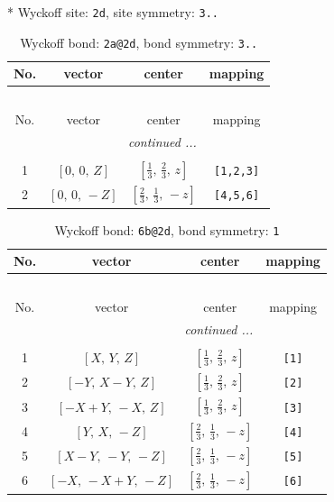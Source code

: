 \documentclass[fleqn,8pt]{jsarticle}
\begin{document}
* Wyckoff site: {\tt 2d}, site symmetry: {\tt 3..}
\renewcommand{\arraystretch}{1.2}
\begin{longtable}{cccc}
\caption{Wyckoff bond: {\tt 2a@2d}, bond symmetry: {\tt 3..}}
 \\
 \hline \hline
No. & vector & center & mapping \\ \hline \endfirsthead

\multicolumn{3}{l}{\tablename\ \thetable{}} \\
 \hline \hline
No. & vector & center & mapping \\ \hline \endhead

 \hline \hline
\multicolumn{3}{r}{\footnotesize\it continued ...} \\ \endfoot

 \hline \hline
\multicolumn{3}{r}{} \\ \endlastfoot

1 & $\left[ 0,\, 0,\, Z \right]$ & $\left[ \frac{1}{3},\, \frac{2}{3},\, z \right]$ & {\tt [1,2,3]} \\ \hline
2 & $\left[ 0,\, 0,\, - Z \right]$ & $\left[ \frac{2}{3},\, \frac{1}{3},\, - z \right]$ & {\tt [4,5,6]} \\
\end{longtable}
\renewcommand{\arraystretch}{1.2}
\begin{longtable}{cccc}
\caption{Wyckoff bond: {\tt 6b@2d}, bond symmetry: {\tt 1}}
 \\
 \hline \hline
No. & vector & center & mapping \\ \hline \endfirsthead

\multicolumn{3}{l}{\tablename\ \thetable{}} \\
 \hline \hline
No. & vector & center & mapping \\ \hline \endhead

 \hline \hline
\multicolumn{3}{r}{\footnotesize\it continued ...} \\ \endfoot

 \hline \hline
\multicolumn{3}{r}{} \\ \endlastfoot

1 & $\left[ X,\, Y,\, Z \right]$ & $\left[ \frac{1}{3},\, \frac{2}{3},\, z \right]$ & {\tt [1]} \\ \hline
2 & $\left[ - Y,\, X - Y,\, Z \right]$ & $\left[ \frac{1}{3},\, \frac{2}{3},\, z \right]$ & {\tt [2]} \\ \hline
3 & $\left[ - X + Y,\, - X,\, Z \right]$ & $\left[ \frac{1}{3},\, \frac{2}{3},\, z \right]$ & {\tt [3]} \\ \hline
4 & $\left[ Y,\, X,\, - Z \right]$ & $\left[ \frac{2}{3},\, \frac{1}{3},\, - z \right]$ & {\tt [4]} \\ \hline
5 & $\left[ X - Y,\, - Y,\, - Z \right]$ & $\left[ \frac{2}{3},\, \frac{1}{3},\, - z \right]$ & {\tt [5]} \\ \hline
6 & $\left[ - X,\, - X + Y,\, - Z \right]$ & $\left[ \frac{2}{3},\, \frac{1}{3},\, - z \right]$ & {\tt [6]} \\
\end{longtable}
\end{document}
